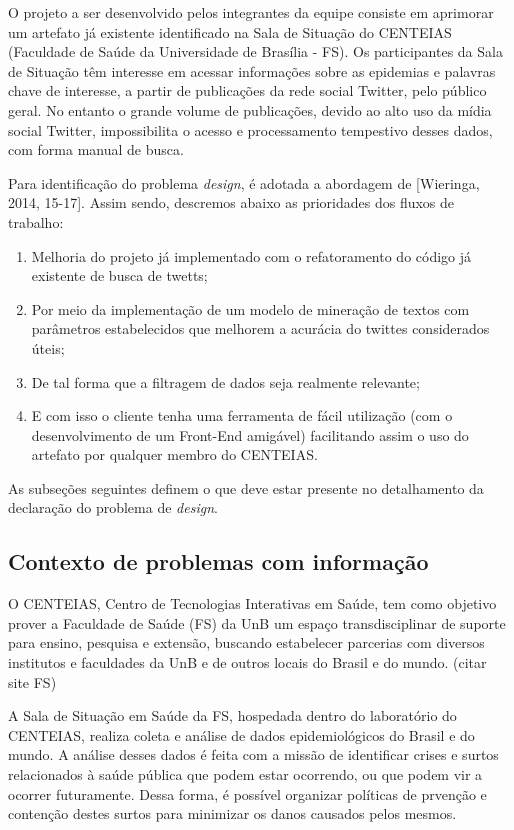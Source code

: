 \documentclass[12pt]{article}
\begin{document}
	O projeto a ser desenvolvido pelos integrantes da equipe consiste em aprimorar um artefato já existente identificado na Sala de Situação do CENTEIAS (Faculdade de Saúde da Universidade de Brasília - FS). Os participantes da Sala de Situação têm interesse em acessar informações sobre as epidemias e palavras chave de interesse, a partir de publicações da rede social Twitter, pelo público geral. No entanto o grande volume de publicações, devido ao alto uso da mídia social Twitter, impossibilita o acesso e processamento tempestivo desses dados, com forma manual de busca.
	
	Para identificação do problema \textit{design}, é adotada a abordagem de [Wieringa, 2014, 15-17]. Assim sendo, descremos abaixo as prioridades dos fluxos de trabalho: 
	\begin{enumerate}
    \item Melhoria do projeto já implementado com o refatoramento do código já existente de busca de twetts;
		\item Por meio da implementação de um modelo de mineração de textos com parâmetros estabelecidos que melhorem a acurácia do twittes considerados úteis;
		\item De tal forma que a filtragem de dados seja realmente relevante;
		\item E com isso o cliente tenha uma ferramenta de fácil utilização (com o desenvolvimento de um Front-End amigável) facilitando assim o uso do artefato por qualquer membro do CENTEIAS.
        \end{enumerate}
	
	As subseções seguintes definem o que deve estar presente no detalhamento da declaração do problema de \textit{design}.
	
	\subsection{Contexto de problemas com informação\label{contexto}}
    O CENTEIAS, Centro de Tecnologias Interativas em Saúde, tem como objetivo prover a Faculdade de Saúde (FS) da UnB um espaço transdisciplinar de suporte para ensino, pesquisa e extensão, buscando estabelecer parcerias com diversos institutos e faculdades da UnB e de outros locais do Brasil e do mundo. (citar site FS)
    
    A Sala de Situação em Saúde da FS, hospedada dentro do laboratório do CENTEIAS, realiza coleta e análise de dados epidemiológicos do Brasil e do mundo. A análise desses dados é feita com a missão de identificar crises e surtos relacionados à saúde pública que podem estar ocorrendo, ou que podem vir a ocorrer futuramente. Dessa forma, é possível organizar políticas de prvenção e contenção destes surtos para minimizar os danos causados pelos mesmos.
    
\end{document}
